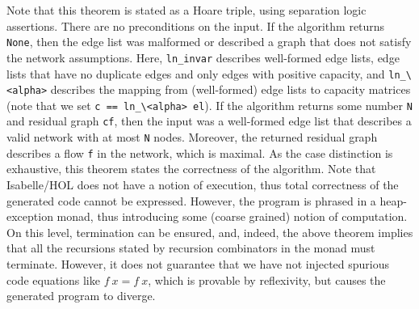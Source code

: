 \documentclass[smallcondensed]{svjour3}     %
\newcommand{\isai}{\lstinline[language=isabelle,basicstyle=\normalsize\ttfamily\slshape]}
\begin{document}
  \noindent Note that this theorem is stated as a Hoare triple, using separation logic~\cite{Rey02,LaMe12} assertions. There are no preconditions on the input.
  If the algorithm returns \isai{None}, then the edge list was malformed or described a graph that does not satisfy the network assumptions.
  Here, \isai{ln_invar} describes well-formed edge lists, \ie edge lists that have no duplicate edges and only edges with positive capacity,
  and \isai{ln_\<alpha>} describes the mapping from (well-formed) edge lists to capacity matrices (note that we set \isai{c == ln_\<alpha> el}).
  If the algorithm returns some number \isai{N} and residual graph \isai{cf}, then the input was a well-formed edge list that describes a valid network with at most \isai{N} nodes.
  Moreover, the returned residual graph describes a flow \isai{f} in the network, which is maximal. 
  As the case distinction is exhaustive, this theorem states the correctness of the algorithm. 
  Note that Isabelle/HOL does not have a notion of execution, thus total correctness of the generated code cannot be expressed. However, the program is phrased in a heap-exception monad, thus introducing some (coarse grained) notion of
  computation. On this level, termination can be ensured, and, indeed, the above theorem implies that all the recursions stated by recursion 
  combinators in the monad must terminate. However, it does not guarantee that we have not injected spurious code equations like $f~x = f~x$, 
  which is provable by reflexivity, but causes the generated program to diverge.
\end{document}
